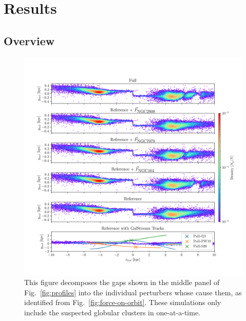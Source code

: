 \documentclass{aa}
\begin{document}
\section{Results}



  \subsection{Overview}

    \begin{figure}
      \centering
      \includegraphics[width=\linewidth]{decomposition-monte-carlo-009-with-3-gaps.png}
      \caption{This figure decomposes the gaps shown in the middle panel of Fig.~\ref{fig:profiles} into the individual perturbers whose cause them, as identified from Fig.~\ref{fig:force-on-orbit}. These simulations only include the suspected globular clusters in one-at-a-time.}
      \label{fig:decomposition}
    \end{figure} 
    
\end{document}
